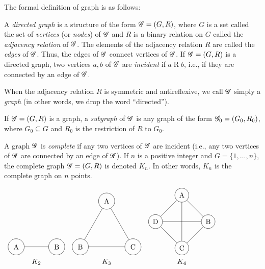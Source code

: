 The formal definition of graph is as follows:

\begin{definition}
A \emph{directed graph} is a structure of the form $\mathscr{G}=(G,R)$, where $G$ is a set called the set of \emph{vertices} (or \emph{nodes}) of $\mathscr{G}$ and $R$ is a binary relation on $G$ called the \emph{adjacency relation} of $\mathscr{G}$. The elements of the adjacency relation $R$ are called the \emph{edges} of $\mathscr{G}$. Thus, the edges of $\mathscr{G}$ connect vertices of $\mathscr{G}$. If $\mathscr{G}=(G,R)$ is a directed graph, two vertices $a, b$ of $\mathscr{G}$ are \emph{incident} if $a\mathrel{R}b$, i.e., if they are connected by an edge of $\mathscr{G}$.

When the adjacency relation $R$ is symmetric and antireflexive, we call $\mathscr{G}$ simply a \emph{graph} (in other words, we drop the word ``directed''). 

If $\mathscr{G}=(G,R)$ is a graph, a \emph{subgraph} of $\mathscr{G}$ is any graph of the form  $\mathscr{G}_0=(G_0,R_0)$, where $G_0\subseteq G$ and $R_0$ is the restriction of $R$ to $G_0$.

A graph $\mathscr{G}$ is \emph{complete} if any two vertices of $\mathscr{G}$ are incident (i.e., any two vertices of $\mathscr{G}$ are connected by an edge of $\mathscr{G}$). If $n$ is a positive integer and $G=\{1,\dots, n\}$, the complete graph  $\mathscr{G}=(G,R)$ is denoted $K_n$. In other words, $K_n$ is the complete graph on $n$ points.

\end{definition}


\begin{center} $ \begin{array}{ccc}
    \begin{tikzpicture}[every node/.style={circle, draw, minimum size=8mm}]
        \node (a) at (0,0) {A};
        \node (b) at (2,0) {B};
        \draw (a)--(b);
    \end{tikzpicture}
&
    \begin{tikzpicture}[every node/.style={circle, draw, minimum size=8mm}]
        \node (a) at (90:1.5) {A};
        \node (b) at (210:1.5) {B};
        \node (c) at (330:1.5) {C};
        \draw (a)--(b);
        \draw (b)--(c);
        \draw (c)--(a);
    \end{tikzpicture}
&
    \begin{tikzpicture}[every node/.style={circle, draw, minimum size=6mm}]
        \node (a) at (90:1.3) {A};
        \node (b) at (0:1.3) {B};
        \node (c) at (270:1.3) {C};
        \node (d) at (180:1.3) {D};
        \draw (a)--(b);
        \draw (a)--(c);
        \draw (a)--(d);
        \draw (b)--(c);
        \draw (b)--(d);
        \draw (c)--(d);
    \end{tikzpicture}
\\
   K_2 & K_3 & K_4
\end{array} $ \end{center}

